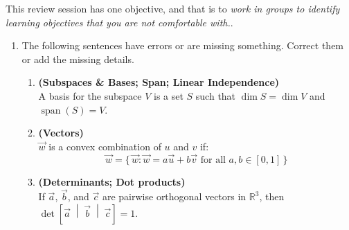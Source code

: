 \documentclass[red]{tutorial}
\newcommand{\R}{\mathbb{R}}
\newcommand{\mute}[1]{}
\DeclareMathOperator{\Span} {span}
\theoremstyle{definition}
\theoremstyle{theorem}
\begin{document}
\begin{tutorial}
  \begin{objectives}
    This review session has one objective, and that is to 
    \emph{work in groups to identify learning objectives that you 
    are not comfortable with.}.
  \end{objectives}
  \begin{enumerate}
    \item The following sentences have errors or are missing 
      something. Correct them or add the missing details.
      \begin{enumerate}
          \mute{
        \item \textbf{(Linear Transformations)}\\
          A transformation $f\colon\R^n\to \R^m$ is linear if 
          it sends sums to sums, $f(\vec0) = \vec0$, and 
          $f(\alpha \vec x) = \alpha f(\vec x)$.
        \item 
          An $n\times m$ matrix corresponds to a linear 
          transformation from $\R^n$
          to $\R^m$.
          }
        \item \textbf{(Subspaces \& Bases; Span; Linear Independence)}\\
          A basis for the subspace $V$ is a set $S$ 
          such that $\dim S = \dim V$ and $\Span(S) = V$.
        \item \textbf{(Vectors)}\\
          $\vec w$ is a convex combination of $u$ and $v$ if:
          \begin{equation*}
            \vec w =
            \bigl\{\,\vec w:\vec w = a\vec u %
            +b\vec v \text{ for all } a,b\in [0,1]\,
            \bigr\}
          \end{equation*}
        \item \textbf{(Determinants; Dot products)} \\
          If $\vec a$, $\vec b$, and $\vec c$ are pairwise orthogonal 
          vectors in $\R^3$, then 
          $\det \left[\vec a\;\middle|\;\vec b\;\middle|\;\vec c\right] = 1$.

\end{enumerate}
\end{enumerate}
\end{tutorial}
\end{document}
